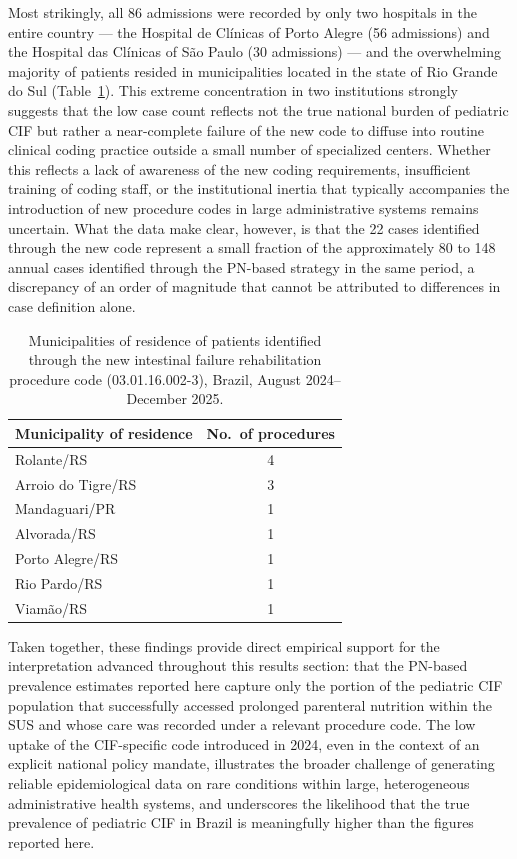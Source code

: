 \documentclass[12pt,a4paper]{article}
\theoremstyle{plain}
\theoremstyle{definition}
\theoremstyle{remark}
\begin{document}
Most strikingly, all 86 admissions were recorded by only two hospitals in the entire country --- the Hospital de Cl\'{i}nicas of Porto Alegre (56 admissions) and the Hospital das Cl\'{i}nicas of S\~{a}o Paulo (30 admissions) --- and the overwhelming majority of patients resided in municipalities located in the state of Rio Grande do Sul (Table~\ref{tab:municipios}). This extreme concentration in two institutions strongly suggests that the low case count reflects not the true national burden of pediatric CIF but rather a near-complete failure of the new code to diffuse into routine clinical coding practice outside a small number of specialized centers. Whether this reflects a lack of awareness of the new coding requirements, insufficient training of coding staff, or the institutional inertia that typically accompanies the introduction of new procedure codes in large administrative systems remains uncertain. What the data make clear, however, is that the 22 cases identified through the new code represent a small fraction of the approximately 80 to 148 annual cases identified through the PN-based strategy in the same period, a discrepancy of an order of magnitude that cannot be attributed to differences in case definition alone.

\begin{table}[ht]
\centering
\caption{Municipalities of residence of patients identified through the new intestinal failure rehabilitation procedure code (03.01.16.002-3), Brazil, August 2024--December 2025.}
\label{tab:municipios}
\begin{tabular}{lc}
\toprule
Municipality of residence & No.\ of procedures \\
\midrule
Rolante/RS & 4 \\
Arroio do Tigre/RS & 3 \\
Mandaguari/PR & 1 \\
Alvorada/RS & 1 \\
Porto Alegre/RS & 1 \\
Rio Pardo/RS & 1 \\
Viam\~{a}o/RS & 1 \\
\bottomrule
\end{tabular}
\end{table}

Taken together, these findings provide direct empirical support for the interpretation advanced throughout this results section: that the PN-based prevalence estimates reported here capture only the portion of the pediatric CIF population that successfully accessed prolonged parenteral nutrition within the SUS and whose care was recorded under a relevant procedure code. The low uptake of the CIF-specific code introduced in 2024, even in the context of an explicit national policy mandate, illustrates the broader challenge of generating reliable epidemiological data on rare conditions within large, heterogeneous administrative health systems, and underscores the likelihood that the true prevalence of pediatric CIF in Brazil is meaningfully higher than the figures reported here.
\end{document}
